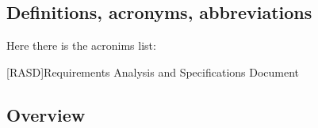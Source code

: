
\subsection{Definitions, acronyms, abbreviations} \label{subsec:def}

Here there is the acronims list:

\begin{acronym}[RASD] %

[RASD]{Requirements Analysis and Specifications Document}

\end{acronym}


\subsection{Overview} \label{subsec:overview}


